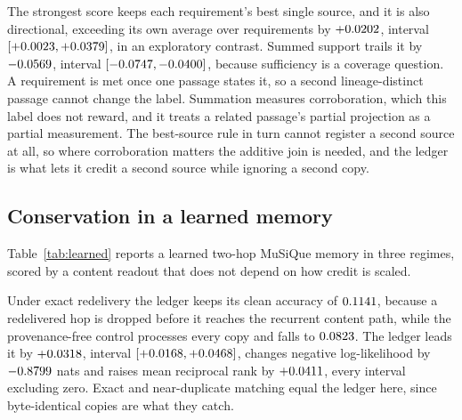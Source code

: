 \documentclass{article}
\begin{document}
The strongest score keeps each requirement's best single source, and it is also
directional, exceeding its own average over requirements by $+0.0202$,
interval $[+0.0023, +0.0379]$, in an exploratory contrast. Summed support trails
it by $-0.0569$, interval $[-0.0747, -0.0400]$, because sufficiency is
a coverage question. A requirement is met once one passage states it, so a
second lineage-distinct passage cannot change the label. Summation measures
corroboration, which this label does not reward, and it treats a related
passage's partial projection as a partial measurement. The best-source rule in
turn cannot register a second source at all, so where corroboration matters the
additive join is needed, and the ledger is what lets it credit a second source
while ignoring a second copy.

\subsection{Conservation in a learned memory}
\label{sec:learned}

Table~\ref{tab:learned} reports a learned two-hop MuSiQue memory in three
regimes, scored by a content readout that does not depend on how credit is
scaled.

\begin{table}[t]
\centering\small
\caption{Learned two-hop MuSiQue memory at sixteenfold delivery, five seeds,
content readout, top-1 accuracy over $555$ candidate answers, where a uniform
guess scores $0.0018$. \emph{Re-chunked} delivers each paragraph with fifteen
windows cut from it, and \emph{fragments} delivers sixteen windows and
withholds the paragraph. Credit is relative to the lineage-distinct ceiling.
Appendix~\ref{app:duplication} gives fourfold delivery, NLL and MRR.}
\label{tab:learned}
\end{table}

Under exact redelivery the ledger keeps its clean accuracy of $0.1141$,
because a redelivered hop is dropped before it reaches the recurrent content
path, while the provenance-free control processes every copy and falls to
$0.0823$. The ledger leads it by $+0.0318$, interval
$[+0.0168, +0.0468]$, changes negative log-likelihood by $-0.8799$ nats
and raises mean reciprocal rank by $+0.0411$, every interval excluding
zero. Exact and near-duplicate matching equal the ledger here, since
byte-identical copies are what they catch.
\end{document}
